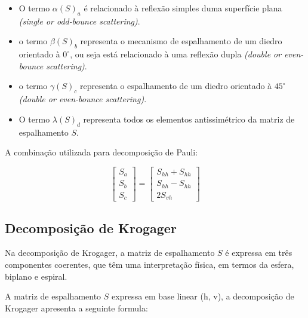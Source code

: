 \documentclass{article}
\begin{document}
\begin{itemize}
    \item O termo $\alpha (S)_{a}$ é relacionado à reflexão simples duma superfície plana \textit{(single or odd-bounce scattering)}.
    
    \item o termo $\beta (S)_{b}$ representa o mecanismo de espalhamento de um diedro orientado à $0^{\circ}$, ou seja está relacionado à uma reflexão dupla \textit{(double or even-bounce scattering)}.
    
    \item o termo $\gamma (S)_{c}$ representa o espalhamento de um diedro orientado à $45^{\circ}$ \textit{(double or even-bounce scattering)}.
    
    \item O termo $\lambda (S)_{d}$ representa todos os elementos antissimétrico da matriz de espalhamento $S$.
\end{itemize}
   
A combinação utilizada para decomposição de Pauli:

\begin{equation}
    \begin{bmatrix}
        S_{a} \\
	    S_{b}\\
	    S_{c}
    \end{bmatrix} = \begin{bmatrix}
        S_{hh} + S_{hh} \\
	    S_{hh} - S_{hh} \\
	    2S_{vh}
    \end{bmatrix}
\end{equation}

\subsection{\textbf{Decomposição de Krogager}}

Na decomposição de Krogager, a matriz de espalhamento $S$ é expressa em três componentes coerentes, que têm uma interpretação física, em termos da esfera, biplano e espiral\cite{jong:2009}.

A matriz de espalhamento $S$ expressa em base linear (h, v), a decomposição de Krogager apresenta a seguinte formula:
\end{document}
